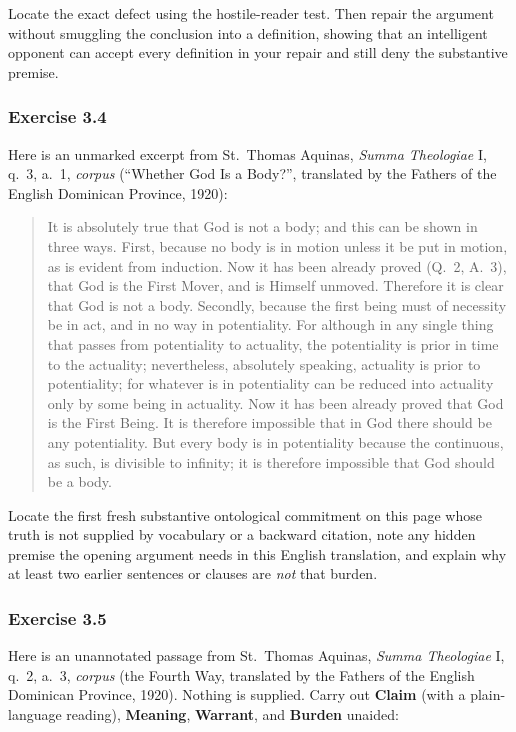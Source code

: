 Locate the exact defect using the hostile-reader test. Then repair the argument without smuggling the conclusion into a definition, showing that an intelligent opponent can accept every definition in your repair and still deny the substantive premise.

\subsubsection*{Exercise 3.4}
Here is an unmarked excerpt from St.\ Thomas Aquinas, \emph{Summa Theologiae} I, q.\ 3, a.\ 1, \emph{corpus} (``Whether God Is a Body?'', translated by the Fathers of the English Dominican Province, 1920):

\begin{quote}
It is absolutely true that God is not a body; and this can be shown in three ways. First, because no body is in motion unless it be put in motion, as is evident from induction. Now it has been already proved (Q.\ 2, A.\ 3), that God is the First Mover, and is Himself unmoved. Therefore it is clear that God is not a body. Secondly, because the first being must of necessity be in act, and in no way in potentiality. For although in any single thing that passes from potentiality to actuality, the potentiality is prior in time to the actuality; nevertheless, absolutely speaking, actuality is prior to potentiality; for whatever is in potentiality can be reduced into actuality only by some being in actuality. Now it has been already proved that God is the First Being. It is therefore impossible that in God there should be any potentiality. But every body is in potentiality because the continuous, as such, is divisible to infinity; it is therefore impossible that God should be a body.
\end{quote}

Locate the first fresh substantive ontological commitment on this page whose truth is not supplied by vocabulary or a backward citation, note any hidden premise the opening argument needs in this English translation, and explain why at least two earlier sentences or clauses are \emph{not} that burden.

\subsubsection*{Exercise 3.5}
Here is an unannotated passage from St.\ Thomas Aquinas, \emph{Summa Theologiae} I, q.\ 2, a.\ 3, \emph{corpus} (the Fourth Way, translated by the Fathers of the English Dominican Province, 1920). Nothing is supplied. Carry out \textbf{Claim} (with a plain-language reading), \textbf{Meaning}, \textbf{Warrant}, and \textbf{Burden} unaided:

